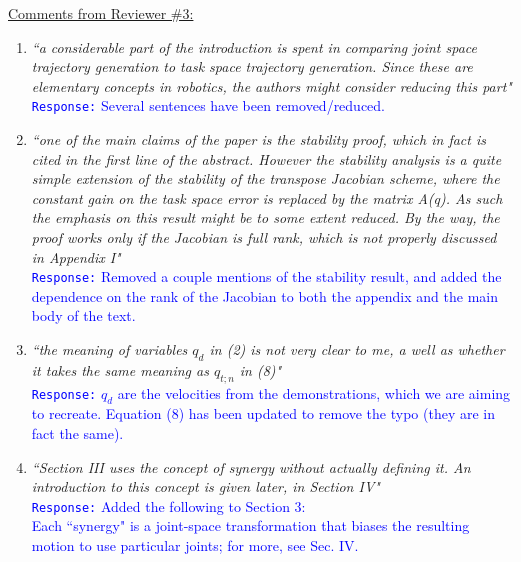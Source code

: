 \documentclass[10pt,stdletter,dateno]{newlfm}
\begin{document}
\begin{newlfm}
\begin{enumerate}
\end{enumerate}


\underline{Comments from Reviewer \#3:}
\begin{enumerate}
\item \textit{``a considerable part of the introduction is spent in comparing joint space trajectory generation to task
space trajectory generation. Since these are elementary concepts in robotics, the authors might consider
reducing this part"}\\
\textcolor{blue}{\texttt{Response:} \small Several sentences have been removed/reduced.}\\

\item \textit{``one of the main claims of the paper is the stability proof, which in fact is cited in the first line of the
abstract. However the stability analysis is a quite simple extension of the stability of the transpose
Jacobian scheme, where the constant gain on the task space error is replaced by the matrix A(q). As
such the emphasis on this result might be to some extent reduced. By the way, the proof works only
if the Jacobian is full rank, which is not properly discussed in Appendix I"}\\
\textcolor{blue}{\texttt{Response:} \small Removed a couple mentions of the stability result, and added the dependence on the rank of the Jacobian to both the appendix and the main body of the text.}\\

\item \textit{``the meaning of variables $q_d$ in (2) is not very clear to me, a well as whether it takes the same meaning
as $q_{t;n}$ in (8)"}\\
\textcolor{blue}{\texttt{Response:} \small $q_d$ are the velocities from the demonstrations, which we are aiming to recreate. Equation (8) has been updated to remove the typo (they are in fact the same).}\\

\item \textit{``Section III uses the concept of synergy without actually defining it. An introduction to this concept is given later, in Section IV"}\\
\textcolor{blue}{\texttt{Response:} \small Added the following to Section 3:\\
Each ``synergy" is a joint-space transformation that biases the resulting motion to use particular joints; for more, see Sec. IV.}\\


\end{enumerate}
\end{newlfm}
\end{document}
